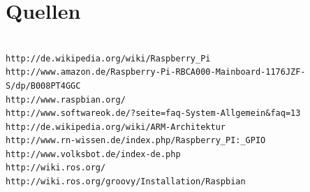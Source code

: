 \documentclass[12pt]{article}
\begin{document}
\section{Quellen}
\begin{verbatim}

http://de.wikipedia.org/wiki/Raspberry_Pi
http://www.amazon.de/Raspberry-Pi-RBCA000-Mainboard-1176JZF-S/dp/B008PT4GGC
http://www.raspbian.org/
http://www.softwareok.de/?seite=faq-System-Allgemein&faq=13
http://de.wikipedia.org/wiki/ARM-Architektur
http://www.rn-wissen.de/index.php/Raspberry_PI:_GPIO
http://www.volksbot.de/index-de.php
http://wiki.ros.org/
http://wiki.ros.org/groovy/Installation/Raspbian
\end{verbatim}
\end{document}
